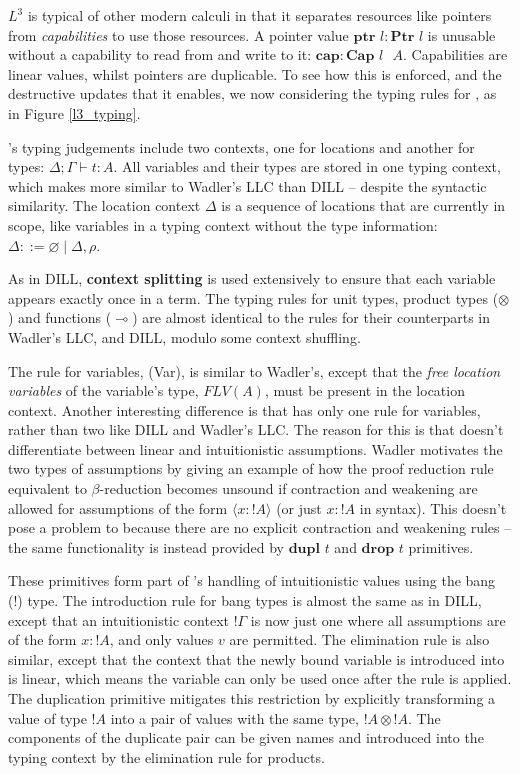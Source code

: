\documentclass[]{unswthesis}
\newcommand{\Lthree}{\text{$L^3$ }}
\let\emptyset\varnothing
\newcommand{\lolly}{\multimap}
\newcommand{\types}{\vdash}
\newcommand{\sor}{\; | \;}
\newcommand{\Ptr}[1]{\textbf{Ptr $#1$}}
\newcommand{\ptr}[1]{\textbf{ptr $#1$}}
\newcommand{\Capa}[2]{\textbf{Cap $#1$ $#2$}}
\newcommand{\capa}{\textbf{cap}}
\newcommand{\dupl}[1]{\textbf{dupl $#1$}}
\newcommand{\drop}[1]{\textbf{drop $#1$}}
\let\i\textit
\let\b\textbf
\begin{document}
$L^3$ is typical of other modern calculi in that it separates resources like pointers from \i{capabilities} to use those resources. A pointer value $\ptr{l} : \Ptr{l}$ is unusable without a capability to read from and write to it: $\capa : \Capa{l}{A}$. Capabilities are linear values, whilst pointers are duplicable. To see how this is enforced, and the destructive updates that it enables, we now considering the typing rules for \Lthree, as in Figure \ref{l3_typing}.

\Lthree's typing judgements include two contexts, one for locations and another for types: $\Delta; \Gamma \types t : A$. All variables and their types are stored in one typing context, which makes \Lthree more similar to Wadler's LLC than DILL -- despite the syntactic similarity. The location context $\Delta$ is a sequence of locations that are currently in scope, like variables in a typing context without the type information: $\Delta ::= \emptyset \sor \Delta, \rho$.

As in DILL, \b{context splitting} is used extensively to ensure that each variable appears exactly once in a term. The typing rules for unit types, product types ($\otimes$) and functions ($\lolly$) are almost identical to the rules for their counterparts in Wadler's LLC, and DILL, modulo some context shuffling.

The rule for variables, (Var), is similar to Wadler's, except that the \i{free location variables} of the variable's type, $FLV(A)$, must be present in the location context. Another interesting difference is that \Lthree has only one rule for variables, rather than two like DILL and Wadler's LLC. The reason for this is that \Lthree doesn't differentiate between linear and intuitionistic assumptions. Wadler motivates the two types of assumptions by giving an example of how the proof reduction rule equivalent to $\beta$-reduction becomes unsound if contraction and weakening are allowed for assumptions of the form $\langle x : {!A} \rangle$ (or just $x : {!A}$ in \Lthree syntax). This doesn't pose a problem to \Lthree because there are no explicit contraction and weakening rules -- the same functionality is instead provided by $\dupl{t}$ and $\drop{t}$ primitives.

These primitives form part of \Lthree's handling of intuitionistic values using the bang (!) type. The introduction rule for bang types is almost the same as in DILL, except that an intuitionistic context $!\Gamma$ is now just one where all assumptions are of the form $x : {!A}$, and only values $v$ are permitted. The elimination rule is also similar, except that the context that the newly bound variable is introduced into is linear, which means the variable can only be used once after the rule is applied. The duplication primitive mitigates this restriction by explicitly transforming a value of type $!A$ into a pair of values with the same type, ${!A} \otimes {!A}$. The components of the duplicate pair can be given names and introduced into the typing context by the elimination rule for products.
\end{document}
